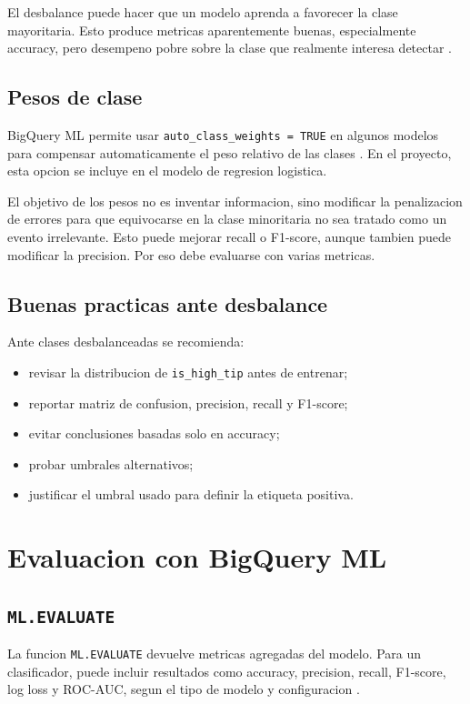 \documentclass[12pt]{article}
\begin{document}
El desbalance puede hacer que un modelo aprenda a favorecer la clase mayoritaria. Esto produce metricas aparentemente buenas, especialmente accuracy, pero desempeno pobre sobre la clase que realmente interesa detectar \cite{google_class_metrics}.

\subsection{Pesos de clase}
BigQuery ML permite usar \texttt{auto\_class\_weights = TRUE} en algunos modelos para compensar automaticamente el peso relativo de las clases \cite{gcp_create_glm}. En el proyecto, esta opcion se incluye en el modelo de regresion logistica.

El objetivo de los pesos no es inventar informacion, sino modificar la penalizacion de errores para que equivocarse en la clase minoritaria no sea tratado como un evento irrelevante. Esto puede mejorar recall o F1-score, aunque tambien puede modificar la precision. Por eso debe evaluarse con varias metricas.

\subsection{Buenas practicas ante desbalance}
Ante clases desbalanceadas se recomienda:
\begin{itemize}[leftmargin=*]
\item revisar la distribucion de \texttt{is\_high\_tip} antes de entrenar;
\item reportar matriz de confusion, precision, recall y F1-score;
\item evitar conclusiones basadas solo en accuracy;
\item probar umbrales alternativos;
\item justificar el umbral usado para definir la etiqueta positiva.
\end{itemize}

\section{Evaluacion con BigQuery ML}
\subsection{\texttt{ML.EVALUATE}}
La funcion \texttt{ML.EVALUATE} devuelve metricas agregadas del modelo. Para un clasificador, puede incluir resultados como accuracy, precision, recall, F1-score, log loss y ROC-AUC, segun el tipo de modelo y configuracion \cite{gcp_evaluate}.
\end{document}
